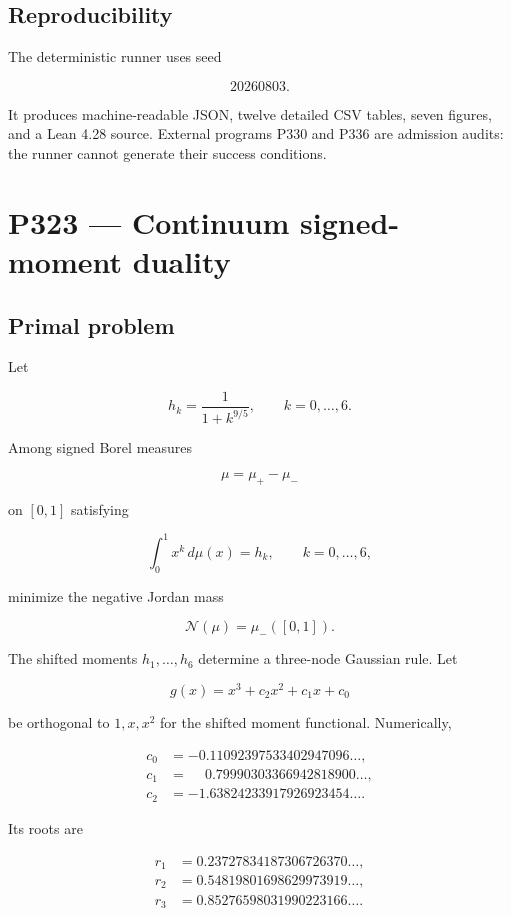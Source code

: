 \documentclass[11pt,a4paper,openany]{report}
\begin{document}
\section{Reproducibility}

The deterministic runner uses seed

\[
20260803.
\]

It produces machine-readable JSON, twelve detailed CSV tables, seven figures, and a Lean 4.28 source.  External programs P330 and P336 are admission audits: the runner cannot generate their success conditions.

\chapter{P323 --- Continuum signed-moment duality}

\section{Primal problem}

Let

\[
h_k=\frac1{1+k^{9/5}},
\qquad k=0,\dots,6.
\]

Among signed Borel measures

\[
\mu=\mu_+-\mu_-
\]

on \([0,1]\) satisfying

\[
\int_0^1 x^k\,d\mu(x)=h_k,
\qquad k=0,\dots,6,
\]

minimize the negative Jordan mass

\[
\mathcal N(\mu)=\mu_-([0,1]).
\]

The shifted moments \(h_1,\ldots,h_6\) determine a three-node Gaussian rule. Let

\[
g(x)=x^3+c_2x^2+c_1x+c_0
\]

be orthogonal to \(1,x,x^2\) for the shifted moment functional.  Numerically,

\[
\begin{aligned}
c_0&=-0.11092397533402947096\ldots,\\
c_1&= \phantom{-}0.79990303366942818900\ldots,\\
c_2&=-1.63824233917926923454\ldots.
\end{aligned}
\]

Its roots are

\[
\begin{aligned}
r_1&=0.23727834187306726370\ldots,\\
r_2&=0.54819801698629973919\ldots,\\
r_3&=0.85276598031990223166\ldots.
\end{aligned}
\]
\end{document}
